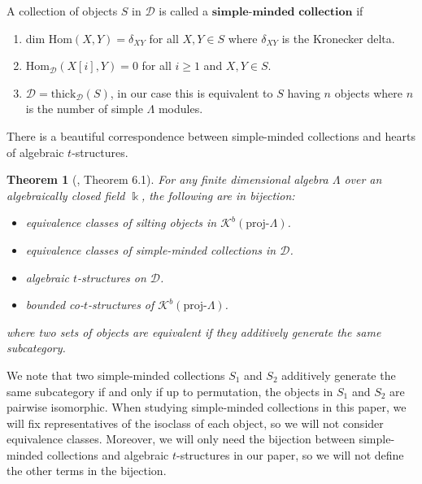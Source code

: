 \documentclass[12pt]{amsart}
\newtheorem{thm}{Theorem}[section]
\theoremstyle{definition}
\theoremstyle{remark}
\numberwithin{equation}{section}
\newcommand{\kk}{\ensuremath{\Bbbk}}
\newcommand{\cD}{\ensuremath{{\mathcal{D}}}}
\newcommand{\cK}{\ensuremath{{\mathcal{K}}}}
\begin{document}
A collection of objects $S$ in $\cD$ is called a $\textbf{simple-minded collection}$ if 

\begin{enumerate}
    \item dim Hom$(X,Y) = \delta_{XY}$ for all $X,Y \in S$ where $\delta_{XY}$ is the Kronecker delta.
    \item Hom$_{\cD}(X[i],Y) = 0$ for all $i\geq1$ and $X,Y\in S$.
    \item $\cD = \text{thick}_{\cD}(S)$, in our case this is equivalent to $S$ having $n$ objects where $n$ is the number of simple $\Lambda$ modules.
\end{enumerate}

There is a beautiful correspondence between simple-minded collections and hearts of algebraic $t$-structures.

\begin{thm}[\cite{koenig2014silting}, Theorem 6.1]\label{thm: koenig-yang}
    For any finite dimensional algebra $\Lambda$ over an algebraically closed field $\kk$, the following are in bijection:
    \begin{itemize}
        \item equivalence classes of silting objects in $\cK^b(\text{proj-}\Lambda)$.
        \item equivalence classes of simple-minded collections in $\cD$.
        \item algebraic $t$-structures on $\cD$.
        \item bounded co-$t$-structures of $\cK^b(\text{proj-}\Lambda)$.
    \end{itemize}
    where two sets of objects are equivalent if they additively generate the same subcategory.
\end{thm}

We note that two simple-minded collections $S_1$ and $S_2$ additively generate the same subcategory if and only if up to permutation, the objects in $S_1$ and $S_2$ are pairwise isomorphic. When studying simple-minded collections in this paper, we will fix representatives of the isoclass of each object, so we will not consider equivalence classes. Moreover, we will only need the bijection between simple-minded collections and algebraic $t$-structures in our paper, so we will not define the other terms in the bijection.
\end{document}
